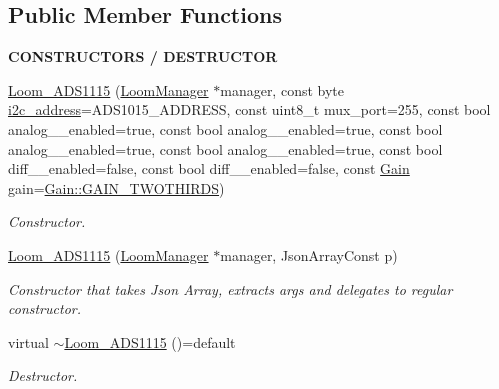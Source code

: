\subsection*{Public Member Functions}
\begin{Indent}{\bf C\+O\+N\+S\+T\+R\+U\+C\+T\+O\+RS / D\+E\+S\+T\+R\+U\+C\+T\+OR}\par
\begin{DoxyCompactItemize}
\item 
\hyperlink{class_loom___a_d_s1115_a19e893a647843f6c69f3050a07317b9d}{Loom\+\_\+\+A\+D\+S1115} (\hyperlink{class_loom_manager}{Loom\+Manager} $\ast$manager, const byte \hyperlink{class_loom_i2_c_sensor_a6ff389c1f015152a9ebfccb037d3d90e}{i2c\+\_\+address}=A\+D\+S1015\+\_\+\+A\+D\+D\+R\+E\+SS, const uint8\+\_\+t mux\+\_\+port=255, const bool analog\+\_\+\_\+enabled=true, const bool analog\+\_\+\_\+enabled=true, const bool analog\+\_\+\_\+enabled=true, const bool analog\+\_\+\_\+enabled=true, const bool diff\+\_\+\_\+enabled=false, const bool diff\+\_\+\_\+enabled=false, const \hyperlink{class_loom___a_d_s1115_a3a8b67f3b5757a84d8066cd9c8ea952a}{Gain} gain=\hyperlink{class_loom___a_d_s1115_a3a8b67f3b5757a84d8066cd9c8ea952aa4f368390110c2278aa3c72e6b085354c}{Gain\+::\+G\+A\+I\+N\+\_\+\+T\+W\+O\+T\+H\+I\+R\+DS})
\begin{DoxyCompactList}\small\item\em Constructor. \end{DoxyCompactList}\item 
\hyperlink{class_loom___a_d_s1115_ab4692a84c54678e8c748256fdfd70e97}{Loom\+\_\+\+A\+D\+S1115} (\hyperlink{class_loom_manager}{Loom\+Manager} $\ast$manager, Json\+Array\+Const p)
\begin{DoxyCompactList}\small\item\em Constructor that takes Json Array, extracts args and delegates to regular constructor. \end{DoxyCompactList}\item 
virtual \hyperlink{class_loom___a_d_s1115_a6faa4607b12d0ea7f45adaeb98eb7b88}{$\sim$\+Loom\+\_\+\+A\+D\+S1115} ()=default
\begin{DoxyCompactList}\small\item\em Destructor. \end{DoxyCompactList}\end{DoxyCompactItemize}
\end{Indent}
